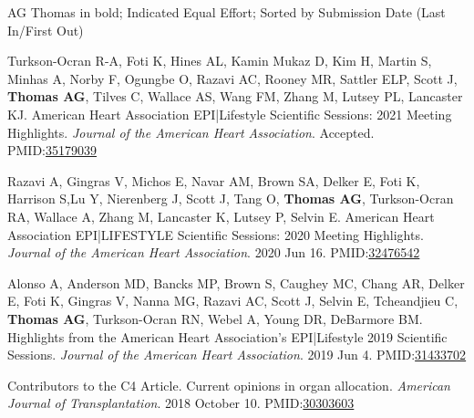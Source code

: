 \documentclass[10pt]{article}
\makeatletter
\newlength{\bibhang}
\newlength{\bibsep}
 {\@listi \global\bibsep\itemsep \global\advance\bibsep by\parsep}
\newenvironment{bibenum*}
  {\renewcommand\labelenumi{[\theenumi]}%
   \etaremune[
     topsep=0pt,
     itemsep=\bibsep,
     parsep=0pt,partopsep=0pt,
     itemindent=-\bibhang,
     leftmargin={\bibhang+\widthof{[999]}}]}
  {\endetaremune}
\renewcommand{\section}[1]{\pagebreak[3]%
    \vspace{1.3\baselineskip}%
    \phantomsection\addcontentsline{toc}{section}{#1}%
    \noindent\llap{\scshape\smash{\parbox[t]{\marginparwidth}{\hyphenpenalty=10000\raggedright #1}}}%
    \vspace{-\baselineskip}\par}
\newcommand{\pmid}[1]{PMID:\href{https://www.ncbi.nlm.nih.gov/pubmed/#1}{#1}}
\makeatother
\begin{document}
\section{Other\\Articles}

  AG Thomas in bold; \textbf{\dag} Indicated Equal Effort;
  Sorted by Submission Date (Last In/First Out)

\vspace{2mm}

\begin{bibenum*}

\item Turkson-Ocran R-A, Foti K, Hines AL, Kamin Mukaz D, Kim H,
  Martin S, Minhas A, Norby F, Ogungbe O, Razavi AC, Rooney MR,
  Sattler ELP, Scott J, \textbf{Thomas AG}, Tilves C, Wallace AS,
  Wang FM, Zhang M, Lutsey PL, Lancaster KJ.
  American Heart Association EPI|Lifestyle Scientific Sessions: 
  2021 Meeting Highlights.
  \emph{Journal of the American Heart Association}. Accepted.
  \pmid{35179039} 

\item Razavi A, Gingras V, Michos E, Navar AM, Brown SA, Delker E, Foti K,
  Harrison S,Lu Y, Nierenberg J, Scott J, Tang O, \textbf{Thomas AG},
  Turkson-Ocran RA, Wallace A, Zhang M, Lancaster K, Lutsey P, Selvin E.
	American Heart Association EPI|LIFESTYLE Scientific Sessions:
  2020 Meeting Highlights.
  \emph{Journal of the American Heart Association}. 2020 Jun 16.
  \pmid{32476542} 

\item Alonso A, Anderson MD, Bancks MP, Brown S, Caughey MC, Chang AR,
  Delker E, Foti K, Gingras V, Nanna MG, Razavi AC, Scott J, Selvin E,
  Tcheandjieu C, \textbf{Thomas AG}, Turkson-Ocran RN,  Webel A,
  Young DR, DeBarmore BM.
  Highlights from the American Heart Association's EPI|Lifestyle 2019
  Scientific Sessions.
  \emph{Journal of the American Heart Association}. 2019 Jun 4.
  \pmid{31433702} 

\item Contributors to the C4 Article. Current opinions in organ allocation.
  \emph{American Journal of Transplantation}. 2018 October 10.
  \pmid{30303603} 

\end{bibenum*}
\end{document}
